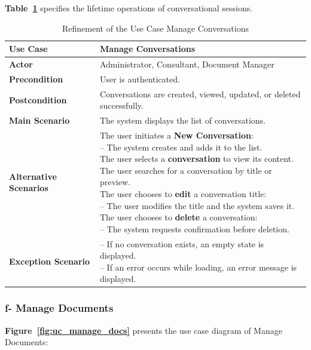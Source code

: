 \textbf{Table~\ref{tab:ref_manage_conv}} specifies the lifetime operations of conversational sessions.

\begin{table}[H]
\centering
\caption{Refinement of the Use Case Manage Conversations}
\label{tab:ref_manage_conv}
\begin{tabular}{|>{\centering\arraybackslash}p{4cm}|p{10cm}|}
\hline
\textbf{Use Case} & Manage Conversations \\ \hline
\textbf{Actor} & Administrator, Consultant, Document Manager \\ \hline
\textbf{Precondition} & User is authenticated. \\ \hline
\textbf{Postcondition} & Conversations are created, viewed, updated, or deleted successfully. \\ \hline
\textbf{Main Scenario} & The system displays the list of conversations. \\ \hline
\textbf{Alternative Scenarios} &
\parbox[t]{10cm}{\small\setlength{\parskip}{1pt}
The user initiates a \textbf{New Conversation}:\newline
\hspace*{0.2cm}-- The system creates and adds it to the list.\newline
The user selects a \textbf{conversation} to view its content.\newline
The user searches for a conversation by title or preview.\newline
The user chooses to \textbf{edit} a conversation title:\newline
\hspace*{0.2cm}-- The user modifies the title and the system saves it.\newline
The user chooses to \textbf{delete} a conversation:\newline
\hspace*{0.2cm}-- The system requests confirmation before deletion.
}\\ \hline
\textbf{Exception Scenario} &
\parbox[t]{10cm}{\small\setlength{\parskip}{1pt}
-- If no conversation exists, an empty state is displayed.\newline
-- If an error occurs while loading, an error message is displayed.
}\\ \hline
\end{tabular}
\end{table}

\subsubsection{f- Manage Documents}
\textbf{Figure~\ref{fig:uc_manage_docs}} presents the use case diagram of Manage Documents:

